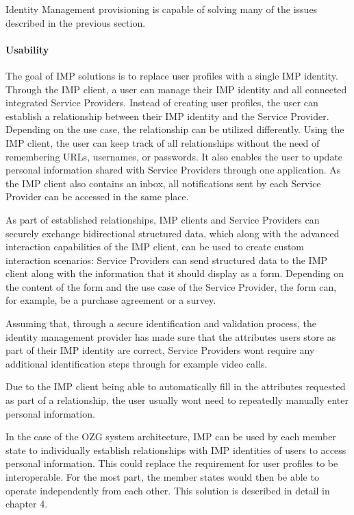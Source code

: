 Identity Management provisioning is capable of solving many of the issues described in the previous section.

\paragraph{Usability}

The goal of IMP solutions is to replace user profiles with a single IMP identity. Through the IMP client, a user can manage their IMP identity and all connected integrated Service Providers. Instead of creating user profiles, the user can establish a relationship between their IMP identity and the Service Provider. Depending on the use case, the relationship can be utilized differently. Using the IMP client, the user can keep track of all relationships without the need of remembering URLs, usernames, or passwords. It also enables the user to update personal information shared with Service Providers through one application. As the IMP client also contains an inbox, all notifications sent by each Service Provider can be accessed in the same place.

As part of established relationships, IMP clients and Service Providers can securely exchange bidirectional structured data, which along with the advanced interaction capabilities of the IMP client, can be used to create custom interaction scenarios: Service Providers can send structured data to the IMP client along with the information that it should display as a form. Depending on the content of the form and the use case of the Service Provider, the form can, for example, be a purchase agreement or a survey. 

Assuming that, through a secure identification and validation process, the identity management provider has made sure that the attributes users store as part of their IMP identity are correct, Service Providers wont require any additional identification steps through for example video calls.

Due to the IMP client being able to automatically fill in the attributes requested as part of a relationship, the user usually wont need to repeatedly manually enter personal information.

In the case of the OZG system architecture, IMP can be used by each member state to individually establish relationships with IMP identities of users to access personal information. This could replace the requirement for user profiles to be interoperable. For the most part, the member states would then be able to operate independently from each other. This solution is described in detail in chapter 4.

